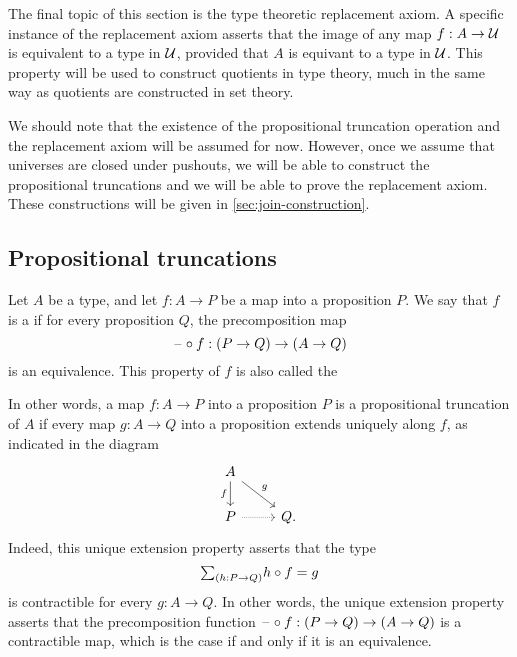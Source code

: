 The final topic of this section is the type theoretic replacement axiom. A specific instance of the replacement axiom asserts that the image of any map $f:A\to\mathcal{U}$ is equivalent to a type in $\mathcal{U}$, provided that $A$ is equivant to a type in $\mathcal{U}$. This property will be used to construct quotients in type theory, much in the same way as quotients are constructed in set theory.

We should note that the existence of the propositional truncation operation and the replacement axiom will be assumed for now. However, once we assume that universes are closed under pushouts, we will be able to construct the propositional truncations and we will be able to prove the replacement axiom. These constructions will be given in \cref{sec:join-construction}.

\subsection{Propositional truncations}\label{sec:propositional-truncation-up}

\begin{defn}
Let $A$ be a type, and let $f:A\to P$ be a map into a proposition $P$. We say that $f$ is a  if for every proposition $Q$, the precomposition map
\begin{equation*}
\mathord{\hspace{1pt}\text{--}\hspace{1pt}}\circ f:(P\to Q)\to (A\to Q)
\end{equation*}
is an equivalence. This property of $f$ is also called the 
\end{defn}

In other words, a map $f:A\to P$ into a proposition $P$ is a propositional truncation of $A$ if every map $g:A\to Q$ into a proposition extends uniquely along $f$, as indicated in the diagram
\begin{equation*}
  \begin{tikzcd}
    A \arrow[d,swap,"f"] \arrow[dr,"g"] \\
    P \arrow[r,densely dotted] & Q.
  \end{tikzcd}
\end{equation*}
Indeed, this unique extension property asserts that the type
\begin{equation*}
  \sm{h:P\to Q}h\circ f=g
\end{equation*}
is contractible for every $g:A\to Q$. In other words, the unique extension property asserts that the precomposition function $\mathord{\hspace{1pt}\text{--}\hspace{1pt}}\circ f:(P\to Q)\to (A\to Q)$ is a contractible map, which is the case if and only if it is an equivalence.

